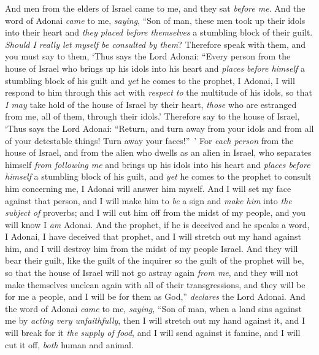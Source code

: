 \begin{biblechapter} %
 And men from the elders of Israel came to me, and they sat \textit{before me}.
\verse And the word of Adonai \textit{came} to me, \textit{saying},
\verse “Son of man, these men took up their idols into their heart and \textit{they placed before themselves} a stumbling block of their guilt. \textit{Should I really let myself be consulted by them}?
\verse Therefore speak with them, and you must say to them, ‘Thus says the Lord Adonai: “Every person from the house of Israel who brings up his idols into his heart and \textit{places before himself} a stumbling block of his guilt and \textit{yet} he comes to the prophet, I Adonai, I will respond to him through this act with \textit{respect to} the multitude of his idols,
\verse so that \textit{I may} take hold of the house of Israel by their heart, \textit{those} who are estranged from me, all of them, through their idols.’
\verse Therefore say to the house of Israel, ‘Thus says the Lord Adonai: “Return, and turn away from your idols and from all of your detestable things! Turn away your faces!” ’
\verse For \textit{each person} from the house of Israel, and from the alien who dwells as an alien in Israel, who separates himself \textit{from following me} and brings up his idols into his heart and \textit{places before himself} a stumbling block of his guilt, and \textit{yet} he comes to the prophet to consult him concerning me, I Adonai will answer him myself.
\verse And I will set my face against that person, and I will make him to \textit{be} a sign and \textit{make him} into \textit{the subject of} proverbs; and I will cut him off from the midst of my people, and you will know I \textit{am} Adonai.
\verse And the prophet, if he is deceived and he speaks a word, I Adonai, I have deceived that prophet, and I will stretch out my hand against him, and I will destroy him from the midst of my people Israel.
\verse And they will bear their guilt, like the guilt of the inquirer so the guilt of the prophet will be,
\verse so that the house of Israel will not go astray again \textit{from me}, and they will not make themselves unclean again with all of their transgressions, and they will be for me a people, and I will be for them as God,” \textit{declares} the Lord Adonai.
 And the word of Adonai \textit{came} to me, \textit{saying},
\verse “Son of man, when a land sins against me by \textit{acting very unfaithfully}, then I will stretch out my hand against it, and I will break for it \textit{the} \textit{supply of food}, and I will send against it famine, and I will cut it off, \textit{both} human and animal.

\end{biblechapter}

